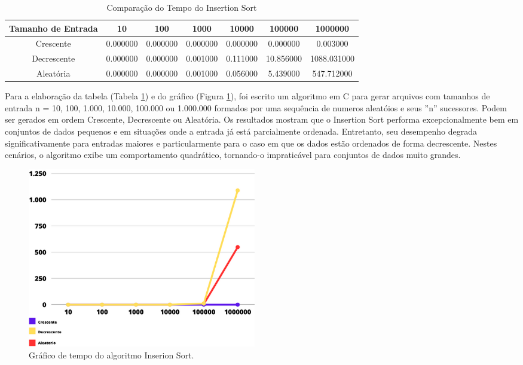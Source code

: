 

\begin{table}[h]
    \centering
    \caption{Comparação do Tempo do Insertion Sort}
    \begin{tabular}{|c|c|c|c|c|c|c|}
        \hline
        Tamanho de Entrada & 10 & 100 & 1000 & 10000 & 100000 & 1000000 \\
        \hline
        Crescente & 0.000000 & 0.000000 & 0.000000 & 0.000000 & 0.000000 & 0.003000 \\
        \hline
        Decrescente & 0.000000 & 0.000000 & 0.001000 & 0.111000 & 10.856000 & 1088.031000 \\
        \hline
        Aleatória & 0.000000 & 0.000000 & 0.001000 & 0.056000 & 5.439000 & 547.712000 \\
        \hline
    \end{tabular}
    \label{tab:comparacao}
\end{table}
Para a elaboração da tabela (Tabela \ref{tab:comparacao}) e do gráfico (Figura \ref{grafico_insert}), foi escrito um algoritmo em C para gerar arquivos com tamanhos de entrada n = 10, 100, 1.000, 10.000, 100.000 ou 1.000.000 formados por uma sequência de numeros aleatóios  e seus ”n” sucessores. Podem ser gerados em ordem Crescente, Decrescente ou Aleatória. Os resultados mostram que o Insertion Sort performa excepcionalmente bem em conjuntos
de dados pequenos e em situações onde a entrada já está parcialmente ordenada. Entretanto,
seu desempenho degrada significativamente para entradas maiores e particularmente para o
caso em que os dados estão ordenados de forma decrescente. Nestes cenários, o algoritmo
exibe um comportamento quadrático, tornando-o impraticável para conjuntos de dados muito
grandes.

 \begin{figure}[htbp]
    \centering
    \includegraphics[width = 10cm]{Imagens/Insertion Sort/graficocanvas.png}
    \caption{Gráfico de tempo do algoritmo Inserion Sort. }
    \label{grafico_insert}
\end{figure}



